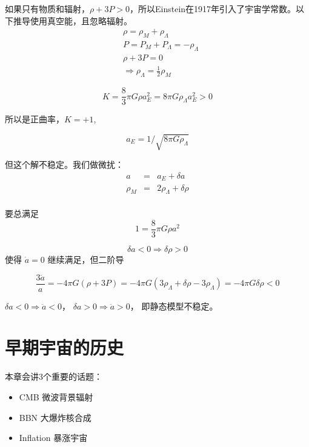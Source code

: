 \documentclass[]{ctexart}
\begin{document}
如果只有物质和辐射，$\rho+3P>0$，所以Einstein在1917年引入了宇宙学常数。以下推导使用真空能，且忽略辐射。
\begin{equation}
    \begin{aligned}
    &\rho=\rho_{M}+\rho_{\Lambda}\\
    &P=P_{M}+P_{\Lambda}=-\rho_{\Lambda}\\
    &\rho+3 P = 0 \\
    & \Rightarrow \rho_{\Lambda}=\frac{1}{2} \rho_{M}
    \end{aligned}
\end{equation}

\begin{equation}
    K=\frac{8}{3} \pi G \rho a_{E}^{2}=8\pi G \rho_\Lambda a_{E}^{2}>0
\end{equation}

所以是正曲率，$K=+1$,

\begin{equation}
    a_E = 1/\sqrt{8\pi G \rho_\Lambda}
\end{equation}

但这个解不稳定。我们做微扰：
\begin{eqnarray}
    a&=&a_{E}+\delta a \\ 
    \rho_{M}&=&2 \rho_\Lambda+\delta \rho \\ 
\end{eqnarray}

要总满足
\begin{equation}
    1=\frac{8}{3} \pi G \rho a^{2}
\end{equation}

\begin{equation}
    \delta a<0 \Rightarrow \delta \rho>0 
\end{equation}
使得 $\dot{a}=0$ 继续满足，但二阶导

\begin{equation}
    \frac{3 \ddot{a}}{a}=-4 \pi G(\rho+3 P)=-4 \pi G\left(3 \rho_\Lambda+\delta \rho-3 \rho_\Lambda\right)=-4 \pi G \delta \rho<0
\end{equation}

$\delta a<0  \Rightarrow \ddot{a}<0$，
$\delta a>0  \Rightarrow \ddot{a}>0$，
即静态模型不稳定。


\section{早期宇宙的历史}

本章会讲3个重要的话题：
\begin{itemize}
    \item CMB 微波背景辐射
    \item BBN 大爆炸核合成
    \item Inflation 暴涨宇宙
\end{itemize}
\end{document}
